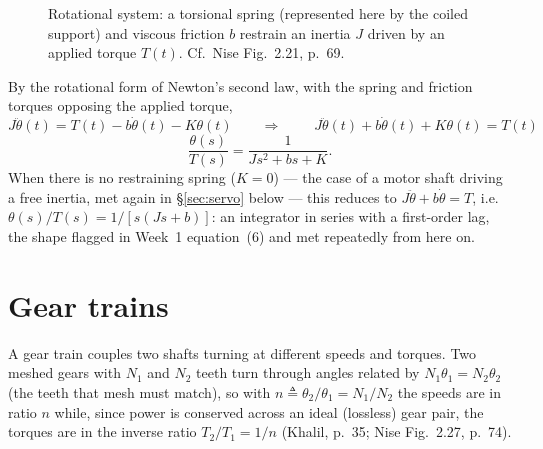 \documentclass[11pt,a4paper]{article}
\begin{document}
\begin{figure}[htbp]
\centering
{}
\caption{Rotational system: a torsional spring (represented here by the coiled
support) and viscous friction $b$ restrain an inertia $J$ driven by an applied
torque $T(t)$. Cf.\ Nise Fig.~2.21, p.~69.}
\label{fig:rot}
\end{figure}

\begin{workedex}[title=Worked example 2.3 --- rotational system]
By the rotational form of Newton's second law, with the spring and friction
torques opposing the applied torque,
\[
  J\ddot\theta(t) = T(t) - b\dot\theta(t) - K\theta(t)
  \qquad\Longrightarrow\qquad
  \boxed{\;J\ddot\theta(t)+b\dot\theta(t)+K\theta(t)=T(t)\;}
\]
\[
  \frac{\theta(s)}{T(s)}=\frac{1}{Js^2+bs+K}.
\]
When there is no restraining spring ($K=0$) --- the case of a motor shaft
driving a free inertia, met again in \S\ref{sec:servo} below --- this reduces
to $J\ddot\theta+b\dot\theta=T$, i.e.\ $\theta(s)/T(s)=1/[s(Js+b)]$: an
integrator in series with a first-order lag, the shape flagged in Week~1
equation~(6) and met repeatedly from here on.
\end{workedex}

\section{Gear trains}
\label{sec:gears}

A gear train couples two shafts turning at different speeds and torques. Two
meshed gears with $N_1$ and $N_2$ teeth turn through angles related by
$N_1\theta_1=N_2\theta_2$ (the teeth that mesh must match), so with
$n\triangleq\theta_2/\theta_1=N_1/N_2$ the speeds are in ratio $n$ while, since
power is conserved across an ideal (lossless) gear pair, the torques are in the
inverse ratio $T_2/T_1=1/n$ (Khalil, p.~35; Nise Fig.~2.27, p.~74).
\end{document}
